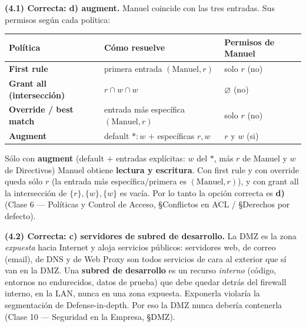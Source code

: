 \textbf{(4.1) Correcta: d) augment.}
Manuel coincide con las tres entradas. Sus permisos según cada política:
\begin{center}
\renewcommand{\arraystretch}{1.25}
\begin{tabular}{>{\bfseries}l l l}
\toprule
Política & Cómo resuelve & Permisos de Manuel\\
\midrule
First rule & primera entrada $(\text{Manuel},r)$ & solo $r$ \;(no)\\
Grant all (intersección) & $r \cap w \cap w$ & $\varnothing$ \;(no)\\
Override / best match & entrada más específica $(\text{Manuel},r)$ & solo $r$ \;(no)\\
Augment & default $\ast{:}w$ $+$ específicas $r,w$ & $r$ y $w$ \;(si)\\
\bottomrule
\end{tabular}
\end{center}
Sólo con \textbf{augment} (default $+$ entradas explícitas: $w$ del $\ast$, más $r$ de Manuel y
$w$ de Directivos) Manuel obtiene \textbf{lectura y escritura}. Con first rule y con override
queda sólo $r$ (la entrada más específica/primera es $(\text{Manuel},r)$), y con grant all la
intersección de $\{r\},\{w\},\{w\}$ es vacía. Por lo tanto la opción correcta es \textbf{d)}
(Clase 6 — Políticas y Control de Acceso, \S Conflictos en ACL / \S Derechos por defecto).

\medskip
\textbf{(4.2) Correcta: c) servidores de subred de desarrollo.}
La DMZ es la zona \emph{expuesta} hacia Internet y aloja servicios públicos: servidores web,
de correo (email), de DNS y de Web Proxy son todos servicios de cara al exterior que sí van en
la DMZ. Una \textbf{subred de desarrollo} es un recurso \emph{interno} (código, entornos no
endurecidos, datos de prueba) que debe quedar detrás del firewall interno, en la LAN, nunca en
una zona expuesta. Exponerla violaría la segmentación de Defense-in-depth. Por eso la DMZ
nunca debería contenerla (Clase 10 — Seguridad en la Empresa, \S DMZ).
